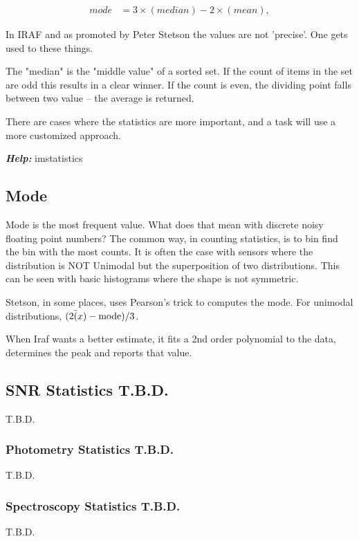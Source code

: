 \begin{subequations}
\begin{align}
mode &= 3\times(median) - 2\times (mean),
\end{align}
\end{subequations}

In IRAF and as promoted by Peter Stetson the values are not 'precise'.
One gets  used to these things.

The "median" is the "middle value" of a sorted set. If the count of
items in the set are odd this results in a clear winner. If the count
is even, the dividing point falls between two value -- the
 average is returned.



There are cases where the statistics are more important, and a task will
use a more customized approach.

\textbf{\emph{Help:}} imstatistics

\subsection{Mode}

Mode is the most frequent value. What does that mean with discrete
noisy floating point numbers? The common way, in counting statistics,
is to bin find the bin with the most counts. It is often the case with
sensors where the distribution is NOT
Unimodal but the superposition of two
distributions. This can be seen with basic histograms where the shape
is not symmetric.

Stetson, in some places, uses Pearson's trick to computes the mode.
For unimodal distributions, $(2\bar(x) - \rm{mode})/3$. 

When Iraf wants a better estimate, it fits a 2nd order polynomial to
the data, determines the peak and reports that value.


\subsection{SNR Statistics T.B.D.}

T.B.D.

\subsubsection{Photometry Statistics T.B.D.}
T.B.D.

\subsubsection{Spectroscopy Statistics T.B.D.}
T.B.D.



